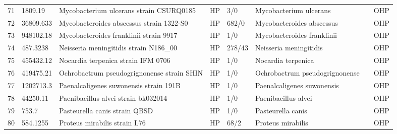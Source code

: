\begin{longtable}{llllllll}
71  &       1809.19 &                                  Mycobacterium ulcerans strain CSURQ0185 &    HP &       3/0 &                         Mycobacterium ulcerans &                                     \cite{saad2020geographic} &   OHP \\
72  &     36809.633 &                                 Mycobacteroides abscessus strain 1322-S0 &    HP &     682/0 &                      Mycobacteroides abscessus &                               \cite{lopeman2019mycobacterium} &   OHP \\
73  &     948102.18 &                                   Mycobacteroides franklinii strain 9917 &    HP &       1/0 &                     Mycobacteroides franklinii &                              \cite{nogueira2015mycobacterium} &   OHP \\
74  &      487.3238 &                                   Neisseria meningitidis strain N186\_00 &    HP &    278/43 &                         Neisseria meningitidis &                                 \cite{bernardini2004proteome} &   OHP \\
75  &     455432.12 &                                       Nocardia terpenica strain IFM 0706 &    HP &       1/0 &                             Nocardia terpenica &                \cite{mehta2020pathogenic,hoshino2007nocardia} &   OHP \\
76  &     419475.21 &                               Ochrobactrum pseudogrignonense strain SHIN &    HP &       1/0 &                 Ochrobactrum pseudogrignonense &            \cite{aguilera2018correct,kampfer2007ochrobactrum} &   OHP \\
77  &     1202713.3 &                                   Paenalcaligenes suwonensis strain 191B &    HP &       1/0 &                     Paenalcaligenes suwonensis &                                         \cite{olowo2020first} &   OHP \\
78  &      44250.11 &                                      Paenibacillus alvei strain bk032014 &    HP &       1/0 &                            Paenibacillus alvei &                                       \cite{padhi2013urinary} &   OHP \\
79  &         753.7 &                                            Pasteurella canis strain QBSD &    HP &       1/0 &                              Pasteurella canis &                                     \cite{zhu2020pasteurella} &   OHP \\
80  &      584.1255 &                                             Proteus mirabilis strain L76 &    HP &      68/2 &                              Proteus mirabilis &                                 \cite{shelenkov2020multidrug} &   OHP \\

\end{longtable}
